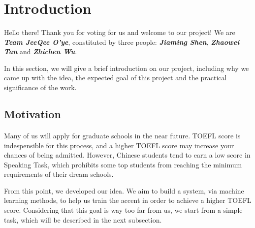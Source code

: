 













\thispagestyle{empty}
\titleGM %

\tableofcontents

\newpage


\section{Introduction}
\paragraph{}
Hello there! Thank you for voting for us and welcome to our project! We are   \textbf{\emph{Team JeeQee O'ye}}, constituted by three people: \textbf{\emph{Jiaming Shen}}, \textbf{\emph{Zhaowei Tan}} and \textbf{\emph{Zhichen Wu}}. 

In this section, we will give a brief introduction on our project, including why we came up with the idea, the expected goal of this project and the practical significance of the work.


\subsection{Motivation}
\paragraph{}
Many of us will apply for graduate schools in the near future. TOEFL score is indespensible for this process, and a higher TOEFL score may increase your chances of being admitted. However, Chinese students tend to earn a low score in Speaking Task, which prohibits some top students from reaching the minimum requirements of their dream schools. 

From this point, we developed our idea. We aim to build a system, via machine learning methods, to help us train the accent in order to achieve a higher TOEFL score. Considering that this goal is way too far from us, we start from a simple task, which will be described in the next subsection.


